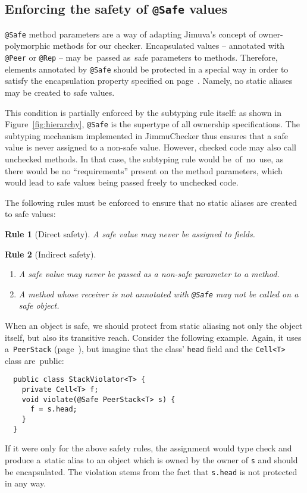 \documentclass{pracamgr}
\theoremstyle{break}
\theoremstyle{break}
\theoremstyle{break}
\newtheorem{verrule}{Rule}
\begin{document}
\subsection{Enforcing the safety of \texttt{@Safe} values}
\label{sec:chk:safe}

\texttt{@Safe} method parameters are a way of adapting Jimuva's
concept of owner-polymorphic methods for our checker. Encapsulated
values -- annotated with \texttt{@Peer} or \texttt{@Rep} -- may
be~passed as~safe parameters to methods. Therefore, elements annotated
by \texttt{@Safe} should be protected in a special way in order to
satisfy the encapsulation property specified on
page~\pageref{inv:encap}. Namely, no static aliases may be created to
safe values.

This condition is partially enforced by the subtyping rule itself: as
shown in Figure~\ref{fig:hierarchy}, \texttt{@Safe} is the supertype
of all ownership specifications. The subtyping mechanism implemented
in JimmuChecker thus ensures that a safe value is never assigned to a
non-safe value. However, checked code may also call unchecked
methods. In that case, the subtyping rule would be~of~no~use, as there
would be no ``requirements'' present on the method parameters, which
would lead to safe values being passed freely to unchecked code.

The following rules must be enforced to ensure that no static aliases
are created to safe values:

\begin{verrule}[Direct safety]
  A safe value may never be assigned to fields. 
\end{verrule}
\vspace{-0.8cm}
\begin{verrule}[Indirect safety]
  \begin{enumerate}[label=(\arabic*)]
  \item A safe value may never be passed as a non-safe parameter to a
    method.
  \item A method whose receiver is not annotated with \texttt{@Safe}
    may not be called on a safe object.
  \end{enumerate}
\end{verrule}

When an object is safe, we should protect from static aliasing not
only the object itself, but also its transitive reach.  Consider the
following example. Again, it uses a~\texttt{PeerStack}
(page~\pageref{lst:stack-peer}), but imagine that the class'
\texttt{head} field and the \texttt{Cell<T>} class are~public:
\begin{lstlisting}
  public class StackViolator<T> {
    private Cell<T> f;
    void violate(@Safe PeerStack<T> s) {
      f = s.head;
    }
  }
\end{lstlisting}
If it were only for the above safety rules, the assignment would
type check and produce a~static alias to an object which is owned by
the owner of \texttt{s} and should be encapsulated. The violation
stems from the fact that \texttt{s.head} is not protected in any way.
\end{document}
